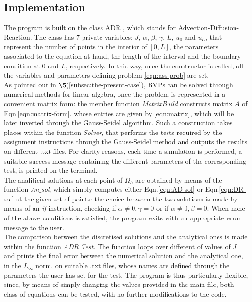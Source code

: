 \documentclass[11pt]{article}
\theoremstyle{theorem}
\theoremstyle{definition}
\begin{document}
\subsection{Implementation}
The program is built on the class ADR , which stands for Advection-Diffusion-Reaction. The class has 7 private variables: $J$, $\alpha$, $\beta$, $\gamma$, $L$, $u_0$ and $u_L$, that represent the number of points in the interior of $[0,L]$, the parameters associated to the equation at hand, the length of the interval and the boundary condition at $0$ and $L$, respectively. In this way, once the constructor is called, all the variables and parameters defining problem \eqref{eqn:ass-prob} are set.\\
As pointed out in $\S$(\ref{subsec:the-present-case}), BVPs can be solved through numerical methods for linear algebra, once the problem is represented in a convenient matrix form: the member function \emph{MatrixBuild} constructs matrix $A$ of Eqn.\eqref{eqn:matrix-form}, whose entries are given by \eqref{eqn:matrix}, which will be later inverted through the Gauss-Seidel algorithm. Such a construction takes places within the function \emph{Solver}, that performs the tests required by the assignment instructions through the Gauss-Seidel method and outputs the results on different .txt files. For clarity reasons,  each time a simulation is performed, a suitable success message containing the different parameters of the corresponding test, is printed on the terminal.\\
The analitical solutions at each point of $\Omega_h$ are obtained by means of the function \emph{An$\_$sol}, which simply computes either Eqn.\eqref{eqn:AD-sol} or Eqn.\eqref{eqn:DR-sol} at the given set of points: the choice between the two solutions is made by means of an \emph{if} instruction, checking if $\alpha\neq 0, \gamma=0$ or if $\alpha\neq 0, \beta=0$. When none of the above conditions is satisfied, the program exits with an appropriate error message to the user.\\
The comparison between the discretised solutions and the analytical ones is made within the function \emph{ADR$\_$Test}. The function loops over different of values of $J$ and prints the final error between the numerical solution and the analytical one, in the $L_\infty$ norm, on suitable .txt files, whose names are defined through the parameters the user has set for the test. The program is thus particularly flexible, since, by means of simply changing the values provided in the main file, both class of equations can be tested, with no further modifications to the code.\\ 
\end{document}
